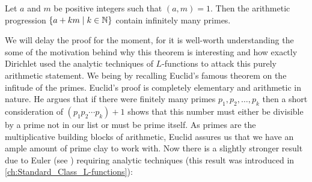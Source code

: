       \begin{theorem}\label{thm:Dirichlet's_theorem_on_primes_in_arithmetic_progressions}
        Let $a$ and $m$ be positive integers such that $(a,m) = 1$. Then the arithmetic progression $\{a+km \mid k \in \mathbb{N}\}$ contain infinitely many primes.
      \end{theorem}

      We will delay the proof for the moment, for it is well-worth understanding the some of the motivation behind why this theorem is interesting and how exactly Dirichlet used the analytic techniques of $L$-functions to attack this purely arithmetic statement. We being by recalling Euclid's famous theorem on the infitude of the primes. Euclid's proof is completely elementary and arithmetic in nature. He argues that if there were finitely many primes $p_{1},p_{2},\ldots,p_{k}$ then a short consideration of $(p_{1}p_{2} \cdots p_{k})+1$ shows that this number must either be divisible by a prime not in our list or must be prime itself. As primes are the multiplicative building blocks of arithmetic, Euclid assures us that we have an ample amount of prime clay to work with. Now there is a slightly stronger result due to Euler (see \cite{euler1737variae}) requiring analytic techniques (this result was introduced in \cref{ch:Standard_Class_L-functions}):

